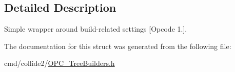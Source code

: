 \subsection{Detailed Description}
Simple wrapper around build-\/related settings \mbox{[}Opcode 1.\mbox{]}. 

The documentation for this struct was generated from the following file\+:\begin{DoxyCompactItemize}
\item 
cmd/collide2/\hyperlink{OPC__TreeBuilders_8h}{O\+P\+C\+\_\+\+Tree\+Builders.\+h}\end{DoxyCompactItemize}
